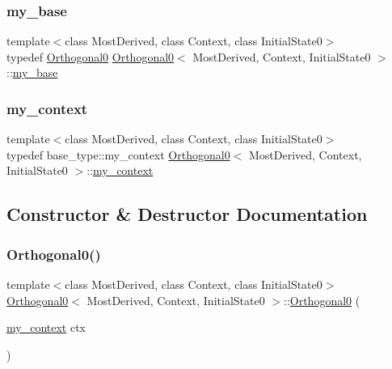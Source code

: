 \subsubsection{\texorpdfstring{my\+\_\+base}{my\_base}}
{\footnotesize\ttfamily template$<$class Most\+Derived, class Context, class Initial\+State0$>$ \\
typedef \mbox{\hyperlink{struct_orthogonal0}{Orthogonal0}} \mbox{\hyperlink{struct_orthogonal0}{Orthogonal0}}$<$ Most\+Derived, Context, Initial\+State0 $>$\+::\mbox{\hyperlink{struct_orthogonal0_abb626b2be8b94179a3b2404893065960}{my\+\_\+base}}}

\mbox{\label{struct_orthogonal0_a9e83fb13d36d05273364de4b3101f135}} 
\subsubsection{\texorpdfstring{my\+\_\+context}{my\_context}}
{\footnotesize\ttfamily template$<$class Most\+Derived, class Context, class Initial\+State0$>$ \\
typedef base\+\_\+type\+::my\+\_\+context \mbox{\hyperlink{struct_orthogonal0}{Orthogonal0}}$<$ Most\+Derived, Context, Initial\+State0 $>$\+::\mbox{\hyperlink{struct_orthogonal0_a9e83fb13d36d05273364de4b3101f135}{my\+\_\+context}}}



\subsection{Constructor \& Destructor Documentation}
\mbox{\label{struct_orthogonal0_a8e9c10e226edd941dba2ecb670ecb7b9}} 
\subsubsection{\texorpdfstring{Orthogonal0()}{Orthogonal0()}}
{\footnotesize\ttfamily template$<$class Most\+Derived, class Context, class Initial\+State0$>$ \\
\mbox{\hyperlink{struct_orthogonal0}{Orthogonal0}}$<$ Most\+Derived, Context, Initial\+State0 $>$\+::\mbox{\hyperlink{struct_orthogonal0}{Orthogonal0}} (\begin{DoxyParamCaption}\item[{\mbox{\hyperlink{struct_orthogonal0_a9e83fb13d36d05273364de4b3101f135}{my\+\_\+context}}}]{ctx }\end{DoxyParamCaption})\hspace{0.3cm}{\ttfamily [inline]}}

